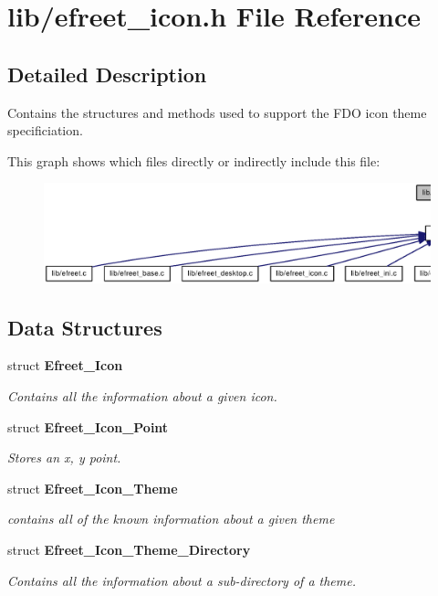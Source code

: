\section{lib/efreet\_\-icon.h File Reference}
\label{efreet__icon_8h}


\subsection{Detailed Description}
Contains the structures and methods used to support the FDO icon theme specificiation. 





This graph shows which files directly or indirectly include this file:\nopagebreak
\begin{figure}[H]
\begin{center}
\leavevmode
\includegraphics[width=420pt]{efreet__icon_8h__dep__incl}
\end{center}
\end{figure}
\subsection*{Data Structures}
\begin{CompactItemize}
\item 
struct {\bf Efreet\_\-Icon}
\begin{CompactList}\small\item\em Contains all the information about a given icon. \item\end{CompactList}\item 
struct {\bf Efreet\_\-Icon\_\-Point}
\begin{CompactList}\small\item\em Stores an x, y point. \item\end{CompactList}\item 
struct {\bf Efreet\_\-Icon\_\-Theme}
\begin{CompactList}\small\item\em contains all of the known information about a given theme \item\end{CompactList}\item 
struct {\bf Efreet\_\-Icon\_\-Theme\_\-Directory}
\begin{CompactList}\small\item\em Contains all the information about a sub-directory of a theme. \item\end{CompactList}\end{CompactItemize}
